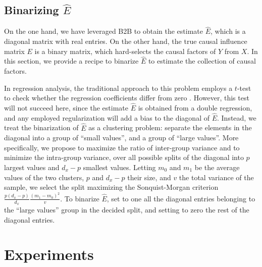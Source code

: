 \documentclass{article}
\begin{document}

\subsection{Binarizing $\hat{E}$}

On the one hand, we have leveraged B2B to obtain the estimate $\hat{E}$, which is a diagonal matrix with real entries.
%
On the other hand, the true causal influence matrix $E$ is a binary matrix, which hard-selects the causal factors of $Y$ from $X$.
%
In this section, we provide a recipe to binarize $\hat{E}$ to estimate the collection of causal factors.

In regression analysis, the traditional approach to this problem employs a $t$-test to check whether the regression coefficients differ from zero \citep{student1908probable}.
%
However, this test will not succeed here, since the estimate $\hat{E}$ is obtained from a double regression, and any employed regularization will add a bias to the diagonal of $\hat{E}$.
%
Instead, we treat the binarization of $\hat{E}$ as a clustering problem: separate the elements in the diagonal into a group of ``small values'', and a group of ``large values''.
%
More specifically, we propose to maximize the ratio of inter-group variance and to minimize the intra-group variance, over all possible splits of the diagonal into $p$ largest values and $d_x-p$ smallest values.
%
Letting $m_0$ and $m_1$ be the average values of the two clusters, $p$ and $d_x-p$ their size, and $v$ the total variance of the sample, we select the split maximizing the Sonquist-Morgan \citep{sonquist_morgan} criterion $\frac{p(d_x-p)}{d_x} \frac{(m_1 - m_0)^2}{v}$.
%
To binarize $\hat{E}$, set to one all the diagonal entries belonging to the ``large values'' group in the decided split, and setting to zero the rest of the diagonal entries.

\section{Experiments}
\end{document}
